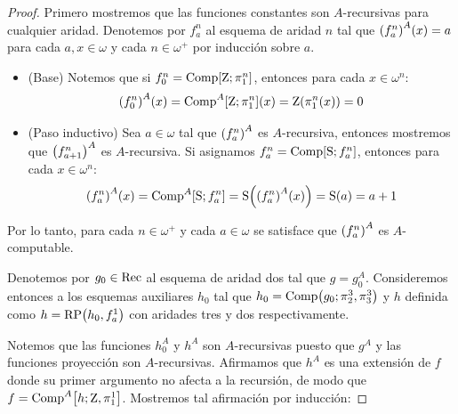 \begin{proof}
	Primero mostremos que las funciones constantes son $A$-recursivas para cualquier aridad. Denotemos por $f_{a}^{n}$ al esquema de aridad $n$ tal que $\pa*{f_{a}^{n}}^{A}\pa*{x} = a$ para cada $a, x\in\omega$ y cada $n\in\omega^{+}$ por inducción sobre $a$.

	\begin{itemize}
		\item (Base) Notemos que si $f_{0}^{n} =\COMPOSICION\bra*{\CERO;\PROYECCION{n}{1}}$, entonces para cada $x\in\omega^{n}$:
		\[
			\pa*{f^{n}_{0}}^{A}\pa*{x} =\COMPOSICION^{A}\bra*{\CERO;\PROYECCION{n}{1}}\pa*{x} =\CERO\pa*{\PROYECCION{n}{1}\pa*{x}} = 0
		\]

		\item (Paso inductivo) Sea $a\in\omega$ tal que $\pa*{f^{n}_{a}}^{A}$ es $A$-recursiva, entonces mostremos que $\pa*{f^{n}_{a + 1}}^{A}$ es $A$-recursiva. Si asignamos $f^{n}_{a} =\COMPOSICION\bra*{\SUCESOR; f^{n}_{a}}$, entonces para cada $x\in\omega^{n}$:
		\[
			\pa*{f^{n}_{a}}^{A}\pa*{x} =\COMPOSICION^{A}\bra*{\SUCESOR; f^{n}_{a}} =\SUCESOR\pa*{\pa*{f^{n}_{a}}^{A}\pa*{x}} =\SUCESOR\pa*{a} = a + 1
		\]
	\end{itemize}

	Por lo tanto, para cada $n\in\omega^{+}$ y cada $a\in\omega$ se satisface que $\pa*{f^{n}_{a}}^{A}$ es $A$-computable.

	Denotemos por $g_{0}\in\RECURSIVO$ al esquema de aridad dos tal que $g = g_{0}^{A}$. Consideremos entonces a los esquemas auxiliares $h_0$ tal que $h_0 = \COMPOSICION\pa*{g_{0};\PROYECCION{3}{2},\PROYECCION{3}{3}}$ y $h$ definida como $h =\RECURSION\pa*{h_{0}, f_{a}^{1}}$ con aridades tres y dos respectivamente.

	Notemos que las funciones $h_0^{A}$ y $h^{A}$ son $A$-recursivas puesto que $g^{A}$ y las funciones proyección son $A$-recursivas. Afirmamos que $h^{A}$ es una extensión de $f$ donde su primer argumento no afecta a la recursión, de modo que $f = \COMPOSICION^{A}\bra*{h; \CERO,\PROYECCION{1}{1}}$. Mostremos tal afirmación por inducción:


\end{proof}
